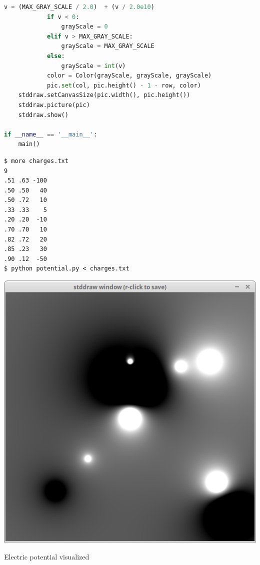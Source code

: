 \documentclass[8pt,a4paper,compress,handout]{beamer}
\begin{document}
\begin{frame}[fragile]
\begin{lstlisting}[language=Python]
            v = (MAX_GRAY_SCALE / 2.0)  + (v / 2.0e10)
            if v < 0:
                grayScale = 0
            elif v > MAX_GRAY_SCALE:
                grayScale = MAX_GRAY_SCALE
            else:
                grayScale = int(v)            
            color = Color(grayScale, grayScale, grayScale)
            pic.set(col, pic.height() - 1 - row, color)
    stddraw.setCanvasSize(pic.width(), pic.height())
    stddraw.picture(pic)
    stddraw.show()

if __name__ == '__main__':
    main()
\end{lstlisting}
\begin{minipage}{150pt}
\begin{lstlisting}[language={}]
$ more charges.txt
9
.51 .63 -100
.50 .50   40
.50 .72   10
.33 .33    5
.20 .20  -10
.70 .70   10
.82 .72   20
.85 .23   30
.90 .12  -50
$ python potential.py < charges.txt
\end{lstlisting}
\end{minipage}%
\hfill
\begin{minipage}{150pt}
\begin{center}
\includegraphics[scale=0.2]{figures/potential.png}

\smallskip

\tiny Electric potential visualized
\end{center}
\end{minipage}
\end{frame}
\end{document}
